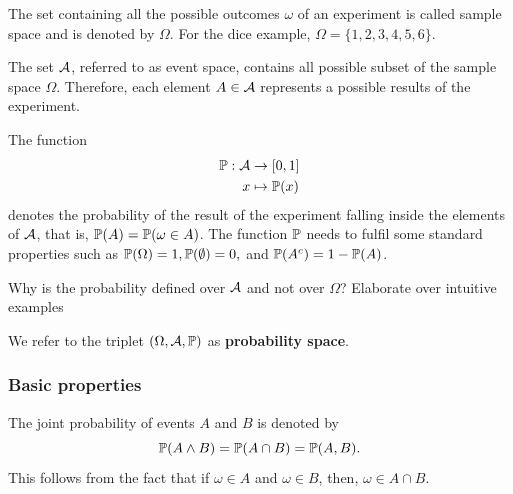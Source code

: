 \begin{definition} The set containing all the possible outcomes $\omega$ of an experiment is called sample space and is denoted by $\Omega$. For the dice example, $\Omega= \{1,2,3,4,5,6\}$.
\end{definition}

\begin{definition} The set $\cA$, referred to as event space, contains all possible subset of the sample space $\Omega$. Therefore, each element $A\in{\mathcal A}$ represents a possible results of the experiment.
\end{definition}

\begin{definition}[Probability] The function
\begin{align}
 	 \mathbb{P}: {\mathcal A} &\to [0,1]\\
 	 x &\mapsto \mathbb{P}(x)
 \end{align}
  denotes the probability of the result of the experiment falling inside the elements of $\cA$, that is, $\mathbb{P}(A) = \mathbb{P}(\omega\in A)$. The function $\mathbb{P}$ needs to fulfil some standard properties such as $\mathbb{P}(\Omega) = 1, \mathbb{P}(\emptyset) = 0,$ and $\mathbb{P}(A^c) = 1-\mathbb{P}(A)$.
\end{definition}

\begin{mdframed}[style=discusion, frametitle={\center Discussion: $\cA$ vs $\Omega$}]

Why is the probability defined over $\cA$ and not over $\Omega$? Elaborate over intuitive examples

\end{mdframed}

\begin{example}
\end{example}

\begin{definition}
We refer to the triplet $(\Omega,{\mathcal A},\mathbb{P})$ as \textbf{probability space}. 
\end{definition}

\subsubsection{Basic properties}
\label{cap:prob_basicprop}

The joint probability of events $A$ and $B$ is denoted by
\begin{equation}
	\mathbb{P}(A\wedge B) =\mathbb{P}(A\cap B) = \mathbb{P}(A,B).
\end{equation}
This follows from the fact that if $\omega\in A$ and $\omega\in B$, then, $\omega\in A\cap B$.


